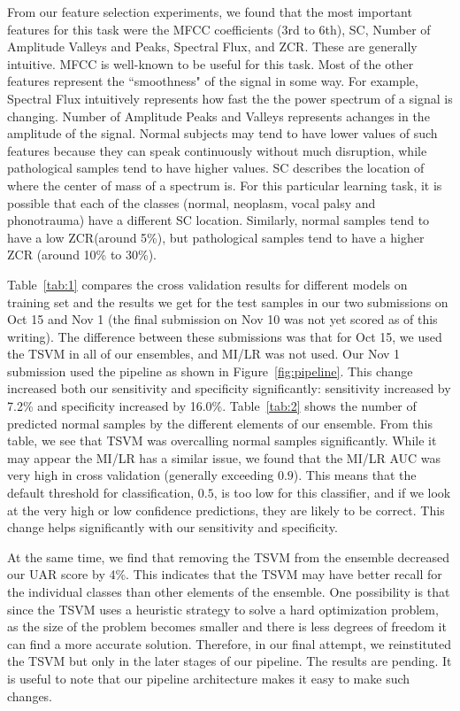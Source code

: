 From our feature selection experiments, we found that the most important features for this task were the MFCC coefficients (3rd to 6th), SC, Number of Amplitude Valleys and Peaks, Spectral Flux, and ZCR. These are generally intuitive. MFCC is well-known to be useful for this task. Most of the other features represent the ``smoothness" of the signal in some way. For example, Spectral Flux intuitively represents how fast the the power spectrum of a signal is changing. Number of Amplitude Peaks and Valleys represents achanges in the amplitude of the signal. Normal subjects may tend to have lower values of such features because they can speak continuously without much disruption, while pathological samples tend to have higher values. SC describes the location of where the center of mass of a spectrum is. For this particular learning task, it is possible that each of the classes (normal, neoplasm, vocal palsy and phonotrauma) have a different SC location. Similarly,  normal samples tend to have a low ZCR(around 5\%), but pathological samples tend to have a higher ZCR (around 10\% to 30\%).

Table~\ref{tab:1} compares the cross validation results for different models on training set and the results we get for the test samples in our two submissions on Oct 15 and Nov 1 (the final submission on Nov 10 was not yet scored as of this writing). The difference between these submissions was that for Oct 15, we used the TSVM in all of our ensembles, and MI/LR was not used. Our Nov 1 submission used the pipeline as shown in Figure~\ref{fig:pipeline}. This change increased both our sensitivity and specificity significantly: sensitivity increased by 7.2\% and specificity increased by 16.0\%.  Table~\ref{tab:2} shows the number of predicted normal samples by the different elements of our ensemble. From this table, we see that TSVM was overcalling normal samples significantly. While it may appear the MI/LR has a similar issue, we found that the MI/LR AUC was very high in cross validation (generally exceeding $0.9$). This means that the default threshold for classification, $0.5$, is too low for this classifier, and if we look at the very high or low confidence predictions, they are likely to be correct. This change helps significantly with our sensitivity and specificity.

At the same time, we find that removing the TSVM from the ensemble decreased our UAR score by 4\%. This indicates that the TSVM may have better recall for the individual classes than other elements of the ensemble. One possibility is that since the TSVM uses a heuristic strategy to solve a hard optimization problem, as the size of the problem becomes smaller and there is less degrees of freedom it can find a more accurate solution. Therefore, in our final attempt, we reinstituted the TSVM but only in the later stages of our pipeline. The results are pending. It is useful to note that our pipeline architecture makes it easy to make such changes.

